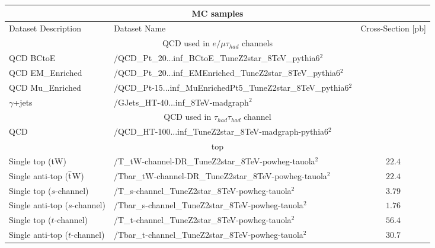 \begin{table}[!ht]
\begin{center}
\small{
\begin{tabular}{|l|l|c|}
\hline
\multicolumn{3}{|c|}{MC samples } \\
\hline
Dataset Description                &   Dataset Name                                            & Cross-Section [pb]    \\
\hline
\multicolumn{3}{|c|}{QCD used in $e/\mu\tau_{had}$ channels }\\
\hline
QCD BCtoE                        &    /QCD\_Pt\_20...inf\_BCtoE\_TuneZ2star\_8TeV\_pythia6$^{2}$                &\\
QCD EM\_Enriched                 &    /QCD\_Pt\_20...inf\_EMEnriched\_TuneZ2star\_8TeV\_pythia6$^{2}$           & \\
QCD Mu\_Enriched                 &    /QCD\_Pt-15...inf\_MuEnrichedPt5\_TuneZ2star\_8TeV\_pythia6$^{2}$         &\\
$\gamma$+jets                       &    /GJets\_HT-40...inf\_8TeV-madgraph$^{2}$                                  &\\
\hline
\multicolumn{3}{|c|}{QCD used in $\tau_{had}\tau_{had}$ channel }\\
\hline
QCD                                &   /QCD\_HT-100...inf\_TuneZ2star\_8TeV-madgraph-pythia6$^{2}$            &\\
\hline

\multicolumn{3}{|c|}{top }\\
\hline
Single top (tW)                    &   /T\_tW-channel-DR\_TuneZ2star\_8TeV-powheg-tauola$^{2}$       & $22.4$                \\
Single anti-top ($\bar{\rm t}$W)   &   /Tbar\_tW-channel-DR\_TuneZ2star\_8TeV-powheg-tauola$^{2}$    & $22.4$\\
Single top ($s$-channel)           &   /T\_s-channel\_TuneZ2star\_8TeV-powheg-tauola$^{2}$           & $3.79$\\
Single anti-top ($s$-channel)      &   /Tbar\_s-channel\_TuneZ2star\_8TeV-powheg-tauola$^{2}$        & $1.76$\\
Single top ($t$-channel)           &   /T\_t-channel\_TuneZ2star\_8TeV-powheg-tauola$^{2}$           & $56.4$\\
Single anti-top ($t$-channel)      &   /Tbar\_t-channel\_TuneZ2star\_8TeV-powheg-tauola$^{2}$        & $30.7$\\


\end{tabular}}
\end{center}
\end{table}
